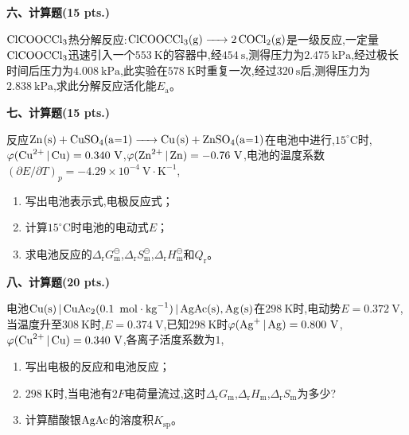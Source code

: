 \vspace{0.5cm}
\noindent\textbf{六、计算题(15 pts.)}

$\ce{ClCOOCCl3}$热分解反应:$\ce{ClCOOCCl3(g) -> 2COCl2(g)}$是一级反应,一定量$\ce{ClCOOCCl3}$迅速引入一个$553\ \mathrm{K}$的容器中,经$454\ \mathrm{s}$,测得压力为$2.475\ \mathrm{kPa}$,经过极长时间后压力为$4.008\ \mathrm{kPa}$,此实验在$578\ \mathrm{K}$时重复一次,经过$320\ \mathrm{s}$后,测得压力为$2.838\ \mathrm{kPa}$,求此分解反应活化能$E_\mathrm{a}$。

\vspace{0.5cm}
\noindent\textbf{七、计算题(15 pts.)}

反应$\ce{Zn(s) + CuSO4(a=1) -> Cu(s) + ZnSO4(a=1)}$在电池中进行,$15^\circ\mathrm{C}$时,$\varphi(\ce{Cu^{2+} | Cu})=0.340\ \mathrm{V}$,$\varphi(\ce{Zn^{2+} | Zn})=-0.76\ \mathrm{V}$,电池的温度系数$(\partial E/\partial T)_p=-4.29\times10^{-4}\ \mathrm{V\cdot K^{-1}}$,
\begin{enumerate}[label=(\arabic*), itemsep=1ex]
    \item 写出电池表示式,电极反应式；
    \item 计算$15^\circ\mathrm{C}$时电池的电动式$E$；
    \item 求电池反应的$\Delta_\mathrm{r}G_\mathrm{m}^\ominus$,$\Delta_\mathrm{r}S_\mathrm{m}^\ominus$,$\Delta_\mathrm{r}H_\mathrm{m}^\ominus$和$Q_\mathrm{r}$。
\end{enumerate}

\vspace{0.5cm}
\noindent\textbf{八、计算题(20 pts.)}

电池$\ce{Cu(s) | CuAc2(0.1\ mol\cdot kg^{-1}) | AgAc(s),Ag(s)}$在$298\ \mathrm{K}$时,电动势$E=0.372\ \mathrm{V}$,当温度升至$308\ \mathrm{K}$时,$E=0.374\ \mathrm{V}$,已知$298\ \mathrm{K}$时$\varphi(\ce{Ag+ | Ag})=0.800\ \mathrm{V}$,$\varphi(\ce{Cu^{2+} | Cu})=0.340\ \mathrm{V}$,各离子活度系数为$1$,
\begin{enumerate}[label=(\arabic*), itemsep=1ex]
    \item 写出电极的反应和电池反应；
    \item $298\ \mathrm{K}$时,当电池有$2F$电荷量流过,这时$\Delta_\mathrm{r}G_\mathrm{m}$,$\Delta_\mathrm{r}H_\mathrm{m}$,$\Delta_\mathrm{r}S_\mathrm{m}$为多少?
    \item 计算醋酸银$\ce{AgAc}$的溶度积$K_{\mathrm{sp}}$。
\end{enumerate}